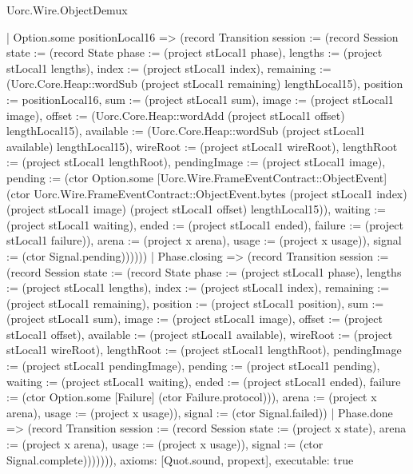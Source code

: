 \begin{lexlean}{Uorc.Wire.ObjectDemux}
\begin{semanticmodule}
{          | Option.some positionLocal16 => (record Transition {session := (record Session {state := (record State {phase := (project stLocal1 phase), lengths := (project stLocal1 lengths), index := (project stLocal1 index), remaining := (Uorc.Core.Heap::wordSub (project stLocal1 remaining) lengthLocal15), position := positionLocal16, sum := (project stLocal1 sum), image := (project stLocal1 image), offset := (Uorc.Core.Heap::wordAdd (project stLocal1 offset) lengthLocal15), available := (Uorc.Core.Heap::wordSub (project stLocal1 available) lengthLocal15), wireRoot := (project stLocal1 wireRoot), lengthRoot := (project stLocal1 lengthRoot), pendingImage := (project stLocal1 image), pending := (ctor Option.some [Uorc.Wire.FrameEventContract::ObjectEvent] (ctor Uorc.Wire.FrameEventContract::ObjectEvent.bytes (project stLocal1 index) (project stLocal1 image) (project stLocal1 offset) lengthLocal15)), waiting := (project stLocal1 waiting), ended := (project stLocal1 ended), failure := (project stLocal1 failure)}), arena := (project x arena), usage := (project x usage)}), signal := (ctor Signal.pending)})))))
        | Phase.closing => (record Transition {session := (record Session {state := (record State {phase := (project stLocal1 phase), lengths := (project stLocal1 lengths), index := (project stLocal1 index), remaining := (project stLocal1 remaining), position := (project stLocal1 position), sum := (project stLocal1 sum), image := (project stLocal1 image), offset := (project stLocal1 offset), available := (project stLocal1 available), wireRoot := (project stLocal1 wireRoot), lengthRoot := (project stLocal1 lengthRoot), pendingImage := (project stLocal1 pendingImage), pending := (project stLocal1 pending), waiting := (project stLocal1 waiting), ended := (project stLocal1 ended), failure := (ctor Option.some [Failure] (ctor Failure.protocol))}), arena := (project x arena), usage := (project x usage)}), signal := (ctor Signal.failed)})
        | Phase.done => (record Transition {session := (record Session {state := (project x state), arena := (project x arena), usage := (project x usage)}), signal := (ctor Signal.complete)})))))),
  axioms: [Quot.sound, propext],
  executable: true
}


\end{semanticmodule}
\end{lexlean}
